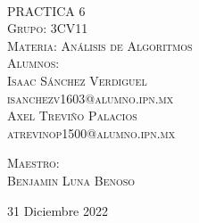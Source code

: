\begin{titlepage}
\begin{minipage}[c][0.81\textheight][t]{0.25\textwidth}
\begin{center}
    \end{center}
  \end{minipage}
  \begin{minipage}[c][0.81\textheight][t]{0.75\textwidth}
    \begin{center}
      \vspace{1cm}

      {\color{black}{\large\scshape Semestre 2023-1}}\\[.2in]

      \vspace{0.5cm}            

      \textsc{\LARGE PRACTICA 6}\\[1.5cm]
      \textsc{\large Grupo: 3CV11}\\[0.5cm]
      \textsc{\large Materia: Análisis de Algoritmos}\\[0.5cm]
      
      {\color{black}\textsc{\large Alumnos:}}\\[0.5cm]
      \textsc{\large {Isaac Sánchez Verdiguel}}\\[1cm]
      \textsc{ {isanchezv1603@alumno.ipn.mx}}\\[1cm]   
      \textsc{\large {Axel Treviño Palacios}}\\[1cm]
      \textsc{ {atrevinop1500@alumno.ipn.mx}}\\[1cm]   
      
      
      
      \vspace{0.5cm}

      {\large\scshape 
        {\color{black}Maestro:}\\[0.3cm] {Benjamin Luna Benoso}}\\[.2in]

      \vspace{0.5cm}
       
      \large{31 Diciembre 2022}
    \end{center}
  \end{minipage}
\end{titlepage}
